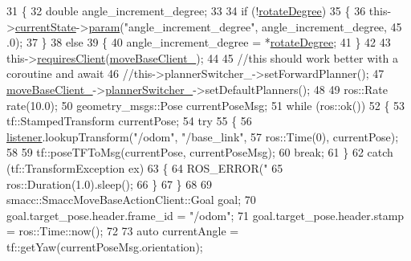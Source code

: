\begin{DoxyCode}
31     \{
32         \textcolor{keywordtype}{double} angle\_increment\_degree;
33 
34         \textcolor{keywordflow}{if} (!\hyperlink{classsm__dance__bot_1_1CbRotate_aede47d27b6caff0d5459afd1762ddda2}{rotateDegree})
35         \{
36             this->\hyperlink{classsmacc_1_1SmaccClientBehavior_af76fc9b877542ed5caf033f820c107d0}{currentState}->\hyperlink{classsmacc_1_1ISmaccState_a4982f2187ed6da337462721146e8ef70}{param}(\textcolor{stringliteral}{"angle\_increment\_degree"}, angle\_increment\_degree, 45
      .0);
37         \}
38         \textcolor{keywordflow}{else}
39         \{
40             angle\_increment\_degree = *\hyperlink{classsm__dance__bot_1_1CbRotate_aede47d27b6caff0d5459afd1762ddda2}{rotateDegree};
41         \}
42 
43         this->\hyperlink{classsmacc_1_1SmaccClientBehavior_adc21bbd45d36bd81ca6f778ed161807a}{requiresClient}(\hyperlink{classsm__dance__bot_1_1CbRotate_a9e4fe62d3ea7ee7c31fb9b328de263fd}{moveBaseClient\_});
44 
45         \textcolor{comment}{//this should work better with a coroutine and await}
46         \textcolor{comment}{//this->plannerSwitcher\_->setForwardPlanner();}
47         \hyperlink{classsm__dance__bot_1_1CbRotate_a9e4fe62d3ea7ee7c31fb9b328de263fd}{moveBaseClient\_}->\hyperlink{classsmacc_1_1SmaccMoveBaseActionClient_ae24164268108abf0b35cf51bfba5ec67}{plannerSwitcher\_}->setDefaultPlanners();
48 
49         ros::Rate rate(10.0);
50         geometry\_msgs::Pose currentPoseMsg;
51         \textcolor{keywordflow}{while} (ros::ok())
52         \{
53             tf::StampedTransform currentPose;
54             \textcolor{keywordflow}{try}
55             \{
56                 \hyperlink{classsm__dance__bot_1_1CbRotate_a40f03a928591fed26f84a35be9ddc741}{listener}.lookupTransform(\textcolor{stringliteral}{"/odom"}, \textcolor{stringliteral}{"/base\_link"},
57                                          ros::Time(0), currentPose);
58 
59                 tf::poseTFToMsg(currentPose, currentPoseMsg);
60                 \textcolor{keywordflow}{break};
61             \}
62             \textcolor{keywordflow}{catch} (tf::TransformException ex)
63             \{
64                 ROS\_ERROR(\textcolor{stringliteral}{"%
65                 ros::Duration(1.0).sleep();
66             \}
67         \}
68 
69         smacc::SmaccMoveBaseActionClient::Goal goal;
70         goal.target\_pose.header.frame\_id = \textcolor{stringliteral}{"/odom"};
71         goal.target\_pose.header.stamp = ros::Time::now();
72 
73         \textcolor{keyword}{auto} currentAngle = tf::getYaw(currentPoseMsg.orientation);
}
\end{DoxyCode}
